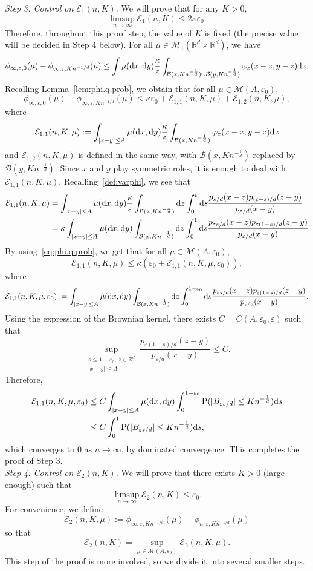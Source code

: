 \documentclass[a4paper,11pt]{amsart}
\numberwithin{equation}{section}
\newcommand{\bbR}{{\ensuremath{\mathbb R}} }
\newcommand{\cB}{{\ensuremath{\mathcal B}} }
\newcommand{\cE}{{\ensuremath{\mathcal E}} }
\newcommand{\cM}{{\ensuremath{\mathcal M}} }
\newcommand{\gep}{\varepsilon}
\newcommand{\gk}{\kappa}
\newcommand{\dd}{\text{\rm d}}             %
\newcommand{\suptwo}[2]{\sup_{\substack{#1 \\ #2}}} %
\newcommand\bP{\ensuremath{\mathrm{P}}}
\newcommand{\8}{\infty}
\newcommand{\beq}{\begin{equation}}
\newcommand{\eeq}{\end{equation}}
\newcommand{\ba}{\begin{aligned}}
\newcommand{\ea}{\end{aligned}}
\begin{document}
{\it Step 3. Control on $\cE_1(n,K)$.} We will prove that for any $K>0$,
\beq
\label{eq:LBCR3}
\limsup_{n\to\infty} \cE_1(n,K) \le 2\gk\gep_0.
\eeq
Therefore, throughout this proof step, the value of $K$ is fixed (the precise value will be decided in Step 4 below).
For all $\mu\in\cM_1(\bbR^d\times \bbR^d)$, we have
\beq
\phi_{\infty,\gep,0}(\mu) - \phi_{\infty,\gep,Kn^{-1/d}}(\mu)
\le \int\mu(\dd x, \dd y) \frac{\gk}{\gep}
\int_{\cB(x,Kn^{-\frac1d})\cup\cB(y,Kn^{-\frac1d})}
\varphi_\gep(x-z,y-z)\dd z.  
\eeq
Recalling Lemma~\ref{lem:phi.q.prob}, we obtain that for all $\mu\in\cM(A,\gep_0)$,
\beq
\phi_{\infty,\gep,0}(\mu) - \phi_{\infty,\gep,Kn^{-1/d}}(\mu)
\le \gk\gep_0 + \cE_{1,1}(n,K,\mu) + \cE_{1,2}(n,K,\mu),
\eeq
where
\beq
\cE_{1,1}(n,K,\mu) :=
\int_{|x-y|\le A}\mu(\dd x, \dd y) \frac{\gk}{\gep}
\int_{\cB(x,Kn^{-\frac1d})}
\varphi_\gep(x-z,y-z)\dd z
\eeq
and $\cE_{1,2}(n,K,\mu)$ is defined in the same way, with $\cB(x,Kn^{-\frac1d})$ replaced by $\cB(y,Kn^{-\frac1d})$. Since $x$ and $y$ play symmetric roles, it is enough to deal with $\cE_{1,1}(n,K,\mu)$. Recalling~\eqref{def:varphi}, we see that
\beq
\ba
\cE_{1,1}(n,K,\mu) &=
\int_{|x-y|\le A}\mu(\dd x, \dd y) \frac{\gk}{\gep}
\int_{\cB(x,Kn^{-\frac1d})} \dd z
\int_0^\gep \dd s \frac{p_{s/d}(x-z)p_{(\gep-s)/d}(z-y)}{p_{\gep/d}(x-y)}\\
&=
\gk\int_{|x-y|\le A}\mu(\dd x, \dd y)
\int_{\cB(x,Kn^{-\frac1d})} \dd z
\int_0^1 \dd s \frac{p_{\gep s/d}(x-z)p_{\gep(1-s)/d}(z-y)}{p_{\gep/d}(x-y)}
\ea
\eeq
By using~\eqref{eq:phi.q.prob}, we get that for all $\mu\in\cM(A,\gep_0)$,
\beq
\cE_{1,1}(n,K,\mu) \le \gk(\gep_0 + \cE_{1,1}(n,K,\mu,\gep_0)),
\eeq
where
\beq
\cE_{1,1}(n,K,\mu,\gep_0) := \int_{|x-y|\le A}\mu(\dd x, \dd y)
\int_{\cB(x,Kn^{-\frac1d})} \dd z
\int_0^{1-\gep_0} \dd s \frac{p_{\gep s/d}(x-z)p_{\gep(1-s)/d}(z-y)}{p_{\gep/d}(x-y)}.
\eeq
Using the expression of the Brownian kernel, there exists $C=C(A,\gep_0,\gep)$ such that
\beq
\suptwo{s\le 1-\gep_0,\ z\in\bbR^d}{|x-y|\le A} \frac{p_{\gep(1-s)/d}(z-y)}{p_{\gep/d}(x-y)} \le C.
\eeq
Therefore,
\beq
\ba
\cE_{1,1}(n,K,\mu,\gep_0) &\le C \int_{|x-y|\le A}\mu(\dd x, \dd y) \int_0^{1-\gep_0}  \bP(|B_{\gep s/d}| \le Kn^{-\frac1d})\dd s\\
&\le C \int_0^1 \bP(|B_{\gep s/d}| \le Kn^{-\frac1d})\dd s,
\ea
\eeq
which converges to $0$ as $n\to \infty$, by dominated convergence. This completes the proof of Step 3.\\

{\it Step 4. Control on $\cE_2(n,K)$.} We will prove that there exists $K>0$ (large enough) such that
\beq
\label{eq:LBCR4}
\limsup_{n\to \infty} \cE_2(n,K) \le \gep_0.
\eeq
For convenience, we define
\beq
\cE_2(n,K,\mu) := \phi_{\infty,\gep,Kn^{-1/d}}(\mu) - \phi_{n,\gep,Kn^{-1/d}}(\mu)
\eeq
so that
\beq
\cE_2(n,K) = \sup_{\mu\in\cM(A,\gep_0)} \cE_2(n,K,\mu).
\eeq
This step of the proof is more involved, so we divide it into several smaller steps.\\
\end{document}
